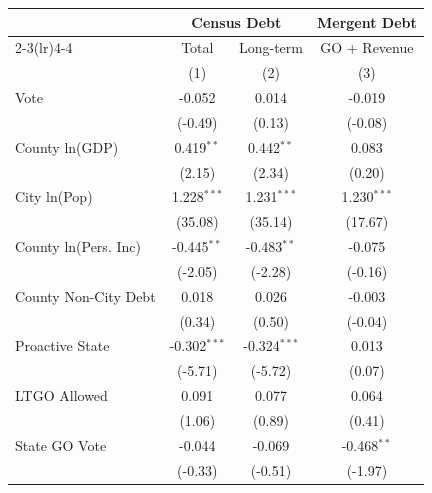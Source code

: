 \begingroup
\centering
\begin{tabular*}{\textwidth}{@{\extracolsep{\fill}}lccc}
   \toprule
                               & \multicolumn{2}{c}{Census Debt} & \multicolumn{1}{c}{Mergent Debt}\\  
   \cmidrule(lr){2-3}\cmidrule(lr){4-4}
                               & Total             & Long-term             & GO + Revenue \\   
                               & (1)               & (2)                   & (3)\\  
   \midrule 
   Vote                        & -0.052            & 0.014                 & -0.019\\   
                               & (-0.49)          & (0.13)               & (-0.08)\\   
   County ln(GDP)              & 0.419$^{**}$      & 0.442$^{**}$          & 0.083\\   
                               & (2.15)           & (2.34)               & (0.20)\\   
   City ln(Pop)                & 1.228$^{***}$     & 1.231$^{***}$         & 1.230$^{***}$\\   
                               & (35.08)          & (35.14)              & (17.67)\\   
   County ln(Pers. Inc)        & -0.445$^{**}$     & -0.483$^{**}$         & -0.075\\   
                               & (-2.05)          & (-2.28)              & (-0.16)\\   
   County Non-City Debt        & 0.018             & 0.026                 & -0.003\\   
                               & (0.34)           & (0.50)               & (-0.04)\\   
   Proactive State             & -0.302$^{***}$    & -0.324$^{***}$        & 0.013\\   
                               & (-5.71)          & (-5.72)              & (0.07)\\   
   LTGO Allowed                & 0.091             & 0.077                 & 0.064\\   
                               & (1.06)           & (0.89)               & (0.41)\\   
   State GO Vote               & -0.044            & -0.069                & -0.468$^{**}$\\   
                               & (-0.33)          & (-0.51)              & (-1.97)\\   

\end{tabular*}
